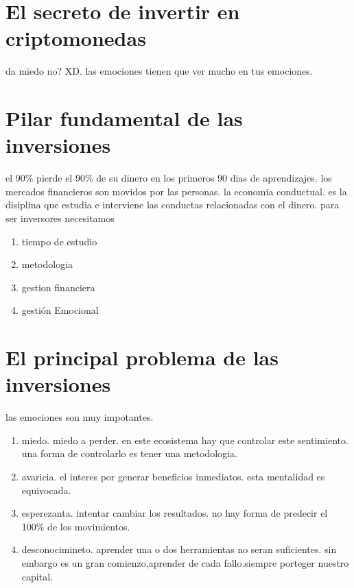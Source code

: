 \documentclass{article}
\begin{document}
    
    \section{El secreto de invertir en criptomonedas}
    da miedo no? XD. las emociones tienen que ver mucho en tus emociones.
    \section{Pilar fundamental de las inversiones}
    el 90\% pierde el 90\% de su dinero en los primeros 90 dias de aprendizajes.
    los mercados financieros son movidos por las personas.
    la economia conductual. es la disiplina que estudia e interviene las conductas relacionadas con el dinero.
    para ser inversores necesitamos \begin{enumerate}
        \item tiempo de estudio
        \item metodologia
        \item gestion financiera
        \item gestión Emocional
    \end{enumerate}
    \section{El principal problema de las inversiones}
    las emociones son muy impotantes.\begin{enumerate}
        \item miedo. miedo a perder. en este ecosistema hay que controlar este sentimiento. una forma de controlarlo es tener una metodologia.
        \item avaricia. el interes por generar beneficios inmediatos. esta mentalidad es equivocada.
        \item esperezanta. intentar cambiar los resultados. no hay forma de predecir el 100\% de los movimientos.
        \item desconocimineto. aprender una o dos herramientas no seran suficientes. sin embargo es un gran comienzo,aprender de cada fallo.siempre porteger nuestro capital.
        
    \end{enumerate}
\end{document}
